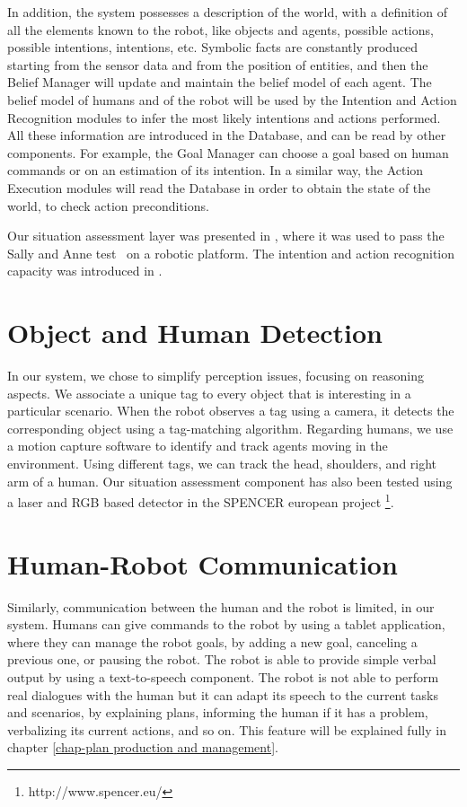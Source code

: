In addition, the system possesses a description of the world, with a definition of all the elements known to the robot, like objects and agents, possible actions, possible intentions, intentions, etc. 
Symbolic facts are constantly produced starting from the sensor data and from the position of entities, and then the Belief Manager will update and maintain the belief model of each agent. The belief model of humans and of the robot will be used by the Intention and Action Recognition modules to infer the most likely intentions and actions performed. All these information are introduced in the Database, and can be read by other components. For example, the Goal Manager can choose a goal based on human commands or on an estimation of its intention. In a similar way, the Action Execution modules will read the Database in order to obtain the state of the world, to check action preconditions.  

Our situation assessment layer was presented in \cite{Milliez2014}, where it was used to pass the Sally and Anne test~\cite{Baron1985} on a robotic platform. The intention and action recognition capacity was introduced in \cite{devin2016some}.

\section{Object and Human Detection}
In our system, we chose to simplify perception issues, focusing on reasoning aspects. We associate a unique tag to every object that is interesting in a particular scenario.  When the robot observes a tag using a camera, it detects the corresponding object using a tag-matching algorithm.
Regarding humans, we use a motion capture software to identify and track agents moving in the environment. Using different tags, we can track the head, shoulders, and right arm of a human. Our situation assessment component has also been tested using a laser and RGB based detector in the SPENCER european project \footnote{http://www.spencer.eu/}.

\section{Human-Robot Communication}
Similarly, communication between the human and the robot is limited, in our system. Humans can give commands to the robot by using a tablet application, where they can manage the robot goals, by adding a new goal, canceling a previous one, or pausing the robot. The robot is able to provide simple verbal output by using a text-to-speech component. The robot is not able to perform real dialogues with the human but it can adapt its speech to the current tasks and scenarios, by explaining plans, informing the human if it has a problem, verbalizing its current actions, and so on. This feature will be explained fully in chapter \ref{chap-plan production and management}. 

